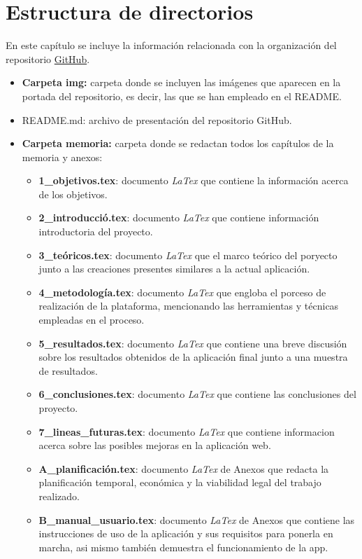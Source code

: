 
\section{Estructura de directorios}
En este capítulo se incluye la información relacionada con la organización del repositorio \href{https://github.com/fariss2/TFG}{GitHub}. 
\begin{itemize}
    \item \textbf{Carpeta img:} carpeta donde se incluyen las imágenes que aparecen en la portada del repositorio, es decir, las que se han empleado en el README.
    \item README.md: archivo de presentación del repositorio GitHub.
    \item \textbf{Carpeta memoria:} carpeta donde se redactan todos los capítulos de la memoria y anexos:
    \begin{itemize}
        \item \textbf{1\_objetivos.tex}: documento \textit{LaTex} que contiene la información acerca de los objetivos.
        \item \textbf{2\_introducció.tex}: documento \textit{LaTex} que contiene información introductoria del proyecto.
        \item \textbf{3\_teóricos.tex}: documento \textit{LaTex} que el marco teórico del poryecto junto a las creaciones presentes similares a la actual aplicación.
        \item \textbf{4\_metodología.tex}:  documento \textit{LaTex} que engloba el porceso de realización de la plataforma, mencionando las herramientas y técnicas empleadas en el proceso.
        \item \textbf{5\_resultados.tex}: documento \textit{LaTex} que contiene una breve discusión sobre los resultados obtenidos de la aplicación final junto a una muestra de resultados.
        \item \textbf{6\_conclusiones.tex}: documento \textit{LaTex} que contiene las conclusiones del proyecto.
        \item \textbf{7\_lineas\_futuras.tex}: documento \textit{LaTex} que contiene informacion acerca sobre las posibles mejoras en la aplicación web.
        \item \textbf{A\_planificación.tex}:  documento \textit{LaTex}  de Anexos que redacta la planificación temporal, económica y la viabilidad legal del trabajo realizado.
        \item \textbf{B\_manual\_usuario.tex}: documento \textit{LaTex}  de Anexos que contiene las instrucciones de uso de la aplicación y sus requisitos para ponerla en marcha, asi mismo también demuestra el funcionamiento de la app.

\end{itemize}
\end{itemize}
